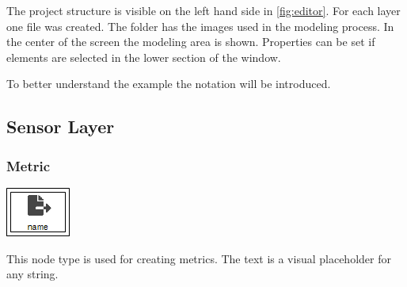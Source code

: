 The project structure is visible on the left hand side in \cref{fig:editor}. For each layer one file was created. The  folder has the images used in the modeling process. In the center of the screen the modeling area is shown. Properties can be set if elements are selected in the lower section of the window.

To better understand the example the notation will be introduced.

\subsection{Sensor Layer}

\subsubsection{Metric}
\noindent\begin{minipage}{0.15\textwidth}%
	\includegraphics[width=\linewidth]{assets/images/metric}
\end{minipage}%
\hfill%
\begin{minipage}{0.8\textwidth}
	This node type is used for creating metrics. The text  is a visual placeholder for any string.
\end{minipage}


